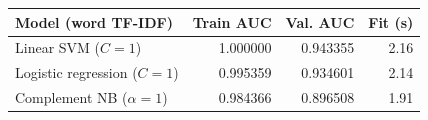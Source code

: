\par\noindent
\begin{tabularx}{\linewidth}{@{}Yrrr@{}}
\toprule
Model (word TF-IDF) & Train AUC & Val. AUC & Fit (s) \\
\midrule
Linear SVM ($C=1$) & 1.000000 & 0.943355 & 2.16 \\
Logistic regression ($C=1$) & 0.995359 & 0.934601 & 2.14 \\
Complement NB ($\alpha=1$) & 0.984366 & 0.896508 & 1.91 \\
\bottomrule
\end{tabularx}
\par
